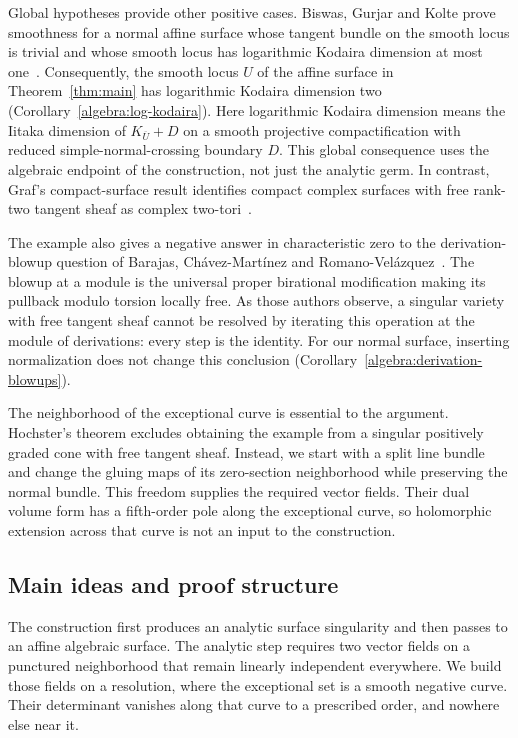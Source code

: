 Global hypotheses provide other positive cases. Biswas, Gurjar and Kolte
prove smoothness for a normal affine surface whose tangent bundle on
the smooth locus is trivial and whose smooth locus has logarithmic
Kodaira dimension at most one~\cite[Theorem~0.1(1)]{BiswasGurjarKolte2014}.
Consequently, the smooth locus $U$ of the affine surface in
Theorem~\ref{thm:main} has logarithmic Kodaira dimension two
(Corollary~\ref{algebra:log-kodaira}). Here logarithmic Kodaira dimension
means the Iitaka dimension of $K_{\overline U}+D$ on a smooth projective
compactification with reduced simple-normal-crossing boundary $D$.
This global consequence uses the algebraic endpoint of the construction,
not just the analytic germ. In contrast, Graf's compact-surface result
identifies compact complex surfaces with free rank-two tangent sheaf as
complex two-tori~\cite[Corollary~1.3]{GrafLowGenus2021}.

The example also gives a negative answer in characteristic zero to the
derivation-blowup question of Barajas, Ch\'avez-Mart\'inez and
Romano-Vel\'azquez~\cite[Introduction, Question~1]{BarajasChavezRomano2026}.
The blowup at a module is the universal proper birational modification
making its pullback modulo torsion locally free. As those authors observe,
a singular variety with free tangent sheaf cannot be resolved by iterating
this operation at the module of derivations: every step is the identity.
For our normal surface, inserting normalization does not change this
conclusion (Corollary~\ref{algebra:derivation-blowups}).

The neighborhood of the exceptional curve is essential to the argument.
Hochster's theorem excludes obtaining the example from a singular
positively graded cone with free tangent sheaf. Instead, we start with a
split line bundle and change the gluing maps of its zero-section
neighborhood while preserving the normal bundle. This freedom supplies
the required vector fields. Their dual volume form has a fifth-order
pole along the exceptional curve, so holomorphic extension across that
curve is not an input to the construction.

\subsection{Main ideas and proof structure}

The construction first produces an analytic surface singularity and then
passes to an affine algebraic surface. The analytic step requires two
vector fields on a punctured neighborhood that remain linearly
independent everywhere. We build those fields on a resolution, where the
exceptional set is a smooth negative curve. Their determinant vanishes
along that curve to a prescribed order, and nowhere else near it.

